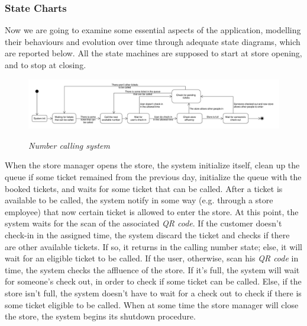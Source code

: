 \documentclass{article}
\begin{document}
		\newpage
		
		\subsubsection{State Charts}
		
		Now we are going to examine some essential aspects of the application, modelling their behaviours and evolution over time through adequate state diagrams, which are reported below. All the state machines are supposed to start at store opening, and to stop at closing.
		
		\begin{figure}[!h]
			\centering
			\hspace*{-1.9cm}\includegraphics[scale=0.32]{StateCharts/number_calling_system.pdf} \\
			\caption{\emph{Number calling system}}
		\end{figure}
	
		When the store manager opens the store, the system initialize itself, clean up the queue if some ticket remained from the previous day, initialize the queue with the booked tickets, and waits for some ticket that can be called. After a ticket is available to be called, the system notify in some way (e.g. through a store employee) that now certain ticket is allowed to enter the store. At this point, the system waits for the scan of the associated \emph{QR code}. If the customer doesn't check-in in the assigned time, the system discard the ticket and checks if there are other available tickets. If so, it returns in the calling number state; else, it will wait for an eligible ticket to be called. If the user, otherwise, scan his \emph{QR code} in time, the system checks the affluence of the store. If it's full, the system will wait for someone's check out, in order to check if some ticket can be called. Else, if the store isn't full, the system doesn't have to wait for a check out to check if there is some ticket eligible to be called. When at some time the store manager will close the store, the system begins its shutdown procedure.
		
		\bigskip
		
\end{document}

